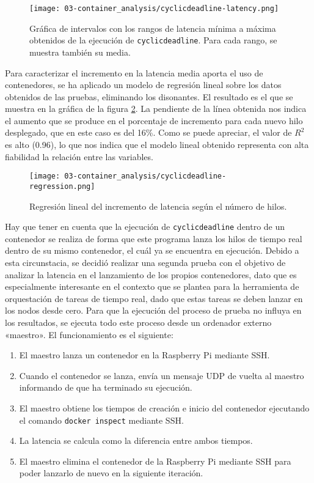 \begin{figure}
    \centering
    \texttt{[image: 03-container\_analysis/cyclicdeadline-latency.png]}
    \caption{Gráfica de intervalos con los rangos de latencia mínima a máxima
        obtenidos de la ejecución de \texttt{cyclicdeadline}. Para cada rango, se
        muestra también su media.}
    \label{fig:03-cyclicdeadline_latency}
\end{figure}

Para caracterizar el incremento en la latencia media aporta el uso de
contenedores, se ha aplicado un modelo de regresión lineal sobre los datos
obtenidos de las pruebas, eliminando los disonantes. El resultado es el que se
muestra en la gráfica de la figura \ref{fig:03-cyclicdeadline_regression}. La
pendiente de la línea obtenida nos indica el aumento que se produce en el
porcentaje de incremento para cada nuevo hilo desplegado, que en este caso es
del 16\%. Como se puede apreciar, el valor de $R^{2}$ es alto (0.96), lo que nos
indica que el modelo lineal obtenido representa con alta fiabilidad la relación
entre las variables.

\begin{figure}
    \centering
    \texttt{[image: 03-container\_analysis/cyclicdeadline-regression.png]}
    \caption{Regresión lineal del incremento de latencia según el número de hilos.}
    \label{fig:03-cyclicdeadline_regression}
\end{figure}

Hay que tener en cuenta que la ejecución de \texttt{cyclicdeadline} dentro de un
contenedor se realiza de forma que este programa lanza los hilos de tiempo real
dentro de su mismo contenedor, el cuál ya se encuentra en ejecución. Debido a
esta circunstacia, se decidió realizar una segunda prueba con el objetivo de
analizar la latencia en el lanzamiento de los propios contenedores, dato que es
especialmente interesante en el contexto que se plantea para la herramienta de
orquestación de tareas de tiempo real, dado que estas tareas se deben lanzar en
los nodos desde cero. Para que la ejecución del proceso de prueba no influya en
los resultados, se ejecuta todo este proceso desde un ordenador externo
«maestro». El funcionamiento es el siguiente:

\begin{enumerate}
    \item El maestro lanza un contenedor en la Raspberry Pi mediante SSH.
    \item Cuando el contenedor se lanza, envía un mensaje UDP de vuelta al
          maestro informando de que ha terminado su ejecución.
    \item El maestro obtiene los tiempos de creación e inicio del contenedor
          ejecutando el comando \texttt{docker inspect} mediante SSH.
    \item La latencia se calcula como la diferencia entre ambos tiempos.
    \item El maestro elimina el contenedor de la Raspberry Pi mediante SSH para
          poder lanzarlo de nuevo en la siguiente iteración.
\end{enumerate}

